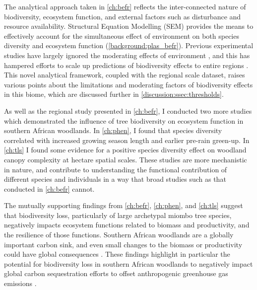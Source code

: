 \begin{refsection}
The analytical approach taken in \autoref{ch:befr} reflects the inter-connected nature of biodiversity, ecosystem function, and external factors such as disturbance and resource availability. Structural Equation Modelling (SEM) provides the means to effectively account for the simultaneous effect of environment on both species diversity and ecosystem function (\autoref{background:plas_befr}). Previous experimental studies have largely ignored the moderating effects of environment \citep{}, and this has hampered efforts to scale up predictions of biodiversity effects to entire regions \citep{}. This novel analytical framework, coupled with the regional scale dataset, raises various points about the limitations and moderating factors of biodiversity effects in this biome, which are discussed further in \autoref{discussion:ssec:thresholds}.

As well as the regional study presented in \autoref{ch:befr}, I conducted two more studies which demonstrated the influence of tree biodiversity on ecosystem function in southern African woodlands. In \autoref{ch:phen}, I found that species diversity correlated with increased growing season length and earlier pre-rain green-up. In \autoref{ch:tls} I found some evidence for a positive species diversity effect on woodland canopy complexity at hectare spatial scales. These studies are more mechanistic in nature, and contribute to understanding the functional contribution of different species and individuals in a way that broad studies such as that conducted in \autoref{ch:befr} cannot. 

The mutually supporting findings from \autoref{ch:befr}, \autoref{ch:phen}, and \autoref{ch:tls} suggest that biodiversity loss, particularly of large archetypal miombo tree species, negatively impacts ecosystem functions related to biomass and productivity, and the resilience of those functions. Southern African woodlands are a globally important carbon sink, and even small changes to the biomass or productivity could have global consequences \citep{}. These findings highlight in particular the potential for biodiversity loss in southern African woodlands to negatively impact global carbon sequestration efforts to offset anthropogenic greenhouse gas emissions \citep{}. 


\end{refsection}
